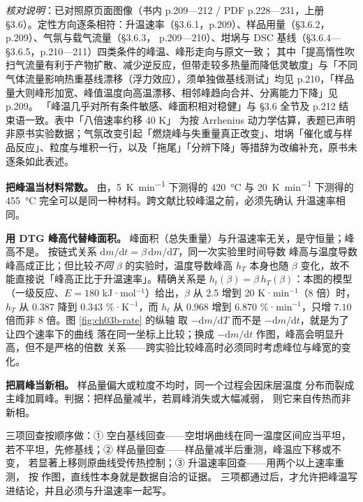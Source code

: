 \emph{核对说明}：已对照原页面图像（书内 p.209—212 / PDF p.228—231，上册 §3.6）。定性方向逐条相符：升温速率（§3.6.1，p.209）、样品用量（§3.6.2，p.209）、气氛与载气流量（§3.6.3，
p.209—210）、坩埚与 DSC 基线（§3.6.4—§3.6.5，p.210—211）四类条件的峰温、峰形走向与原文一致；
其中「提高惰性吹扫气流量有利于产物扩散、减少逆反应，但带走较多热量而降低灵敏度」与「不同气体流量影响热重基线漂移（浮力效应），须单独做基线测试」均见 p.210，「样品量大则峰形加宽、峰值温度向高温漂移、相邻峰趋向合并、分离能力下降」见 p.209。
「峰温几乎对所有条件敏感、峰面积相对稳健」与 §3.6 全节及 p.212 结束语一致。表中「八倍速率约移 40 K」
为按 Arrhenius 动力学估算，表题已声明非原书实验数据；气氛改变引起「燃烧峰与失重量真正改变」、坩埚「催化或与样品反应」、粒度与堆积一行，以及「拖尾」「分辨下降」等措辞为改编补充，原书未逐条如此表述。


\begin{pitfall}
\textbf{把峰温当材料常数。} 由，\qty{5}{K.min^{-1}}
下测得的 \qty{420}{\celsius} 与 \qty{20}{K.min^{-1}} 下测得的
\qty{455}{\celsius} 完全可以是同一种材料。跨文献比较峰温之前，必须先确认
升温速率相同。

\textbf{用 DTG 峰高代替峰面积。} 峰面积（总失重量）与升温速率无关，是守恒量；峰高不是。
按链式关系 $\mathrm{d}m/\mathrm{d}t=\beta\,\mathrm{d}m/\mathrm{d}T$，同一次实验里时间导数
峰高与温度导数峰高成正比；但比较\emph{不同} $\beta$ 的实验时，温度导数峰高 $h_T$ 本身也随
$\beta$ 变化，故不能直接说「峰高正比于升温速率」。精确关系是
$h_t(\beta)=\beta\,h_T(\beta)$：本图的模型（一级反应、$E=180$ kJ·mol$^{-1}$）给出，$\beta$ 从
2.5 增到 20 K·min$^{-1}$（$8$ 倍）时，$h_T$ 从 $0.387$ 降到 $0.343$ \%·K$^{-1}$，而 $h_t$ 从
$0.968$ 增到 $6.870$ \%·min$^{-1}$，只增 $7.10$ 倍而非 $8$ 倍。图 \ref{fig:ch03b-rate} 的纵轴
取 $-\mathrm{d}m/\mathrm{d}T$ 而不是 $-\mathrm{d}m/\mathrm{d}t$，就是为了让四个速率下的曲线
落在同一坐标上比较；换成 $-\mathrm{d}m/\mathrm{d}t$ 作图，峰高会明显升高，但不是严格的倍数
关系——跨实验比较峰高时必须同时考虑峰位与峰宽的变化。

\textbf{把肩峰当新相。} 样品量偏大或粒度不均时，同一个过程会因床层温度
分布而裂成主峰加肩峰。判据：把样品量减半，若肩峰消失或大幅减弱，
则它来自传热而非新相。
\end{pitfall}

\begin{crosscheck}
三项回查按顺序做：① 空白基线回查——空坩埚曲线在同一温度区间应当平坦，
若不平坦，先修基线；② 样品量回查——样品量减半后重测，峰温应下移或不变，
若显著上移则原曲线受传热控制；③ 升温速率回查——用两个以上速率重测，
按 作图，直线性本身就是数据自洽的证据。
三项都通过后，才允许把峰温写进结论，并且必须与升温速率一起写。
\end{crosscheck}

